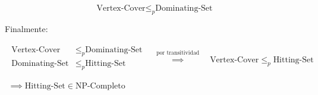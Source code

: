 \[\text{Vertex-Cover} \leq _{p} \text{Dominating-Set}\]


Finalmente:

\[
    \begin{array}{c}
        \begin{split}
            \text{Vertex-Cover}  & \leq _{p} \text{Dominating-Set} \\
            \text{Dominating-Set}  & \leq _{p} \text{Hitting-Set} \\
        \end{split}
        \quad \overset{ \text{por transitividad} }{ \implies  } \quad
        \text{Vertex-Cover}  \leq _{p} \text{Hitting-Set} \\ \\
        \implies \text{Hitting-Set} \in \text{NP-Completo}    
    \end{array}
\]
